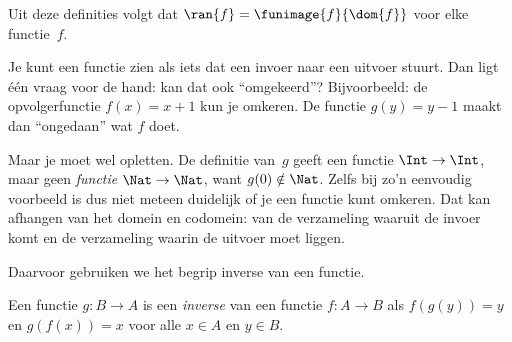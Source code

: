 \documentclass[openany]{memoir}
\begin{document}
\begin{explain}
Uit deze definities volgt dat $\ran{f} =
\funimage{f}{\dom{f}}$ voor elke functie~$f$.
\end{explain}
\endgroup

\begingroup
\def\olfilename{OLP-0024}
\def\olfilepath{content/sets-functions-relations/functions/}
\hypertarget{unit-OLP-0024}{}




\begin{explain}
Je kunt een functie zien als iets dat een invoer naar een uitvoer
stuurt. Dan ligt één vraag voor de hand: kan dat ook ``omgekeerd''?
Bijvoorbeeld: de opvolgerfunctie $f(x) = x + 1$ kun je omkeren. De
functie $g(y) = y - 1$ maakt dan ``ongedaan'' wat $f$ doet.

Maar je moet wel opletten. De definitie van~$g$ geeft een functie
$\Int \to \Int$, maar geen \emph{functie} $\Nat \to \Nat$, want
$g(0) \notin \Nat$. Zelfs bij zo'n eenvoudig voorbeeld is dus niet
meteen duidelijk of je een functie kunt omkeren. Dat kan afhangen van
het domein en codomein: van de verzameling waaruit de invoer komt en de
verzameling waarin de uitvoer moet liggen.

Daarvoor gebruiken we het begrip inverse van een functie.
\end{explain}

\begin{defn}
Een functie $g \colon B \to A$ is een \emph{inverse} van een functie
$f \colon A \to B$ als $f(g(y)) = y$ en $g(f(x)) = x$ voor alle $x
\in A$ en $y \in B$.
\end{defn}
\end{document}
